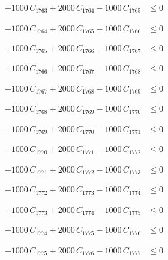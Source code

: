 \documentclass[a4paper,11pt]{article}
\begin{document}
\begin{align}
-1000\,C_{1763} + 2000\,C_{1764} - 1000\,C_{1765} &\leq 0 \nonumber
\end{align}

\begin{align}
-1000\,C_{1764} + 2000\,C_{1765} - 1000\,C_{1766} &\leq 0 \nonumber
\end{align}

\begin{align}
-1000\,C_{1765} + 2000\,C_{1766} - 1000\,C_{1767} &\leq 0 \nonumber
\end{align}

\begin{align}
-1000\,C_{1766} + 2000\,C_{1767} - 1000\,C_{1768} &\leq 0 \nonumber
\end{align}

\begin{align}
-1000\,C_{1767} + 2000\,C_{1768} - 1000\,C_{1769} &\leq 0 \nonumber
\end{align}

\begin{align}
-1000\,C_{1768} + 2000\,C_{1769} - 1000\,C_{1770} &\leq 0 \nonumber
\end{align}

\begin{align}
-1000\,C_{1769} + 2000\,C_{1770} - 1000\,C_{1771} &\leq 0 \nonumber
\end{align}

\begin{align}
-1000\,C_{1770} + 2000\,C_{1771} - 1000\,C_{1772} &\leq 0 \nonumber
\end{align}

\begin{align}
-1000\,C_{1771} + 2000\,C_{1772} - 1000\,C_{1773} &\leq 0 \nonumber
\end{align}

\begin{align}
-1000\,C_{1772} + 2000\,C_{1773} - 1000\,C_{1774} &\leq 0 \nonumber
\end{align}

\begin{align}
-1000\,C_{1773} + 2000\,C_{1774} - 1000\,C_{1775} &\leq 0 \nonumber
\end{align}

\begin{align}
-1000\,C_{1774} + 2000\,C_{1775} - 1000\,C_{1776} &\leq 0 \nonumber
\end{align}

\begin{align}
-1000\,C_{1775} + 2000\,C_{1776} - 1000\,C_{1777} &\leq 0 \nonumber
\end{align}
\end{document}
